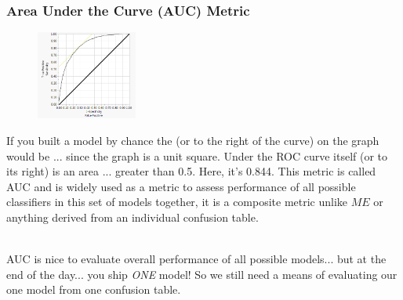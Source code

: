 \documentclass[slides]{beamer} %
\begin{document}
\begin{frame}\frametitle{Area Under the Curve (AUC) Metric}

\vspace{-0.2cm}
\begin{figure}
\centering
\hspace{-0.5cm}\includegraphics[width=1.3in]{roc_curve.png}
\end{figure}

\small
\vspace{-0.3cm}
If you built a model by chance the  (or to the right of the curve) on the graph would be ...  since the graph is a unit square. Under the ROC curve itself (or to its right) is an area ... \pause greater than 0.5. Here, it's 0.844. \pause This metric is called AUC and is widely used as a metric to assess performance of all possible classifiers in this set of models together, it is a composite metric unlike $ME$ or anything derived from an individual confusion table.\\~\\ \pause

AUC is nice to evaluate overall performance of all possible models... but at the end of the day... \pause you ship \emph{ONE} model! \pause So we still need a means of evaluating our one model from one confusion table.

\end{frame}
\end{document}
